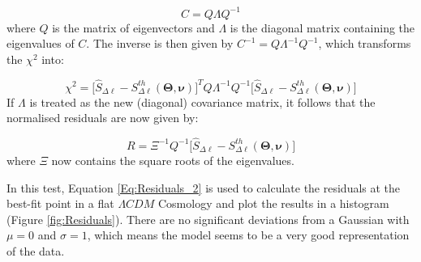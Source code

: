 \begin{equation}
C = Q \Lambda Q^{-1}
\end{equation}
where $Q$ is the matrix of eigenvectors and $\Lambda$ is the diagonal matrix containing the eigenvalues of $C$. The inverse is then given by $C^{-1} = Q \Lambda^{-1} Q^{-1}$, which transforms the $\chi^2$ into:

\begin{equation}
\chi^2 = \big[ \hat{S}_{\Delta\ell} - S^{th}_{\Delta\ell}(\pmb{\Theta}, \pmb{\nu})\big]^T Q \Lambda^{-1} Q^{-1} \big[ \hat{S}_{\Delta\ell} - S^{th}_{\Delta\ell}(\pmb{\Theta}, \pmb{\nu})\big]
\end{equation}
If $\Lambda$ is treated as the new (diagonal) covariance matrix, it follows that the normalised residuals are now given by:

\begin{equation}
R = \Xi^{-1} Q^{-1} \big[ \hat{S}_{\Delta\ell} - S^{th}_{\Delta\ell}(\pmb{\Theta}, \pmb{\nu})\big]
\label{Eq:Residuals_2}
\end{equation}
where $\Xi$ now contains the square roots of the eigenvalues.%

\qquad In this test, Equation \eqref{Eq:Residuals_2} is used to calculate the residuals at the best-fit point in a flat $\Lambda CDM$ Cosmology and plot the results in a histogram (Figure \ref{fig:Residuals}). There are no significant deviations from a Gaussian with $\mu=0$ and $\sigma=1$, which means the model seems to be a very good representation of the data.

